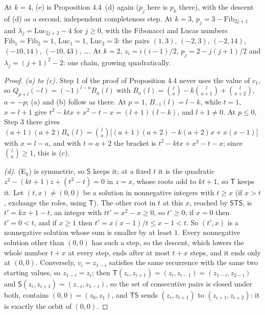 \documentclass[11pt]{article}
\begin{document}
\smallskip
At $k=4$, (e) is Proposition 4.4~(d) again ($p_j$ here is $p_k$ there), with the descent of (d) as a second, independent completeness step. At $k=3$, $p_j=3-\mathrm{Fib}_{2j+1}$ and $\lambda_j=\mathrm{Luc}_{2j+2}-4$ for $j\ge0$, with the Fibonacci and Lucas numbers $\mathrm{Fib}_1=\mathrm{Fib}_2=1$, $\mathrm{Luc}_1=1$, $\mathrm{Luc}_2=3$: the pairs $(1,3)$, $(-2,3)$, $(-2,14)$, $(-10,14)$, $(-10,43)$, \dots. At $k=2$, $z_i=i(i-1)/2$, $p_j=2-j(j+1)/2$ and $\lambda_j=(j+1)^2-2$: one chain, growing quadratically.

\begin{proof}
\emph{(a) to (c).} Step 1 of the proof of Proposition 4.4 never uses the value of $c_1$, so $Q_{p+l}(-l)=(-1)^{l-a}B_a(l)$ with $B_a(l)=\binom{l}{a}-k\binom{l}{a+1}+\binom{l}{a+2}$, $a=-p$; (a) and (b) follow as there. At $p=1$, $B_{-1}(l)=l-k$, while $t=1$, $x=l+1$ give $t^2-ktx+x^2-t-x=(l+1)(l-k)$, and $l+1\ne0$. At $p\le0$, Step 3 there gives $(a+1)(a+2)B_a(l)=\binom{l}{a}\bigl[(a+1)(a+2)-k(a+2)x+x(x-1)\bigr]$ with $x=l-a$, and with $t=a+2$ the bracket is $t^2-ktx+x^2-t-x$; since $\binom{l}{a}\ge1$, this is (c).

\emph{(d).} (E$_k$) is symmetric, so $\mathsf{S}$ keeps it; at a fixed $t$ it is the quadratic $z^2-(kt+1)z+(t^2-t)=0$ in $z=x$, whose roots add to $kt+1$, so $\mathsf{T}$ keeps it. Let $(t,x)\ne(0,0)$ be a solution in nonnegative integers with $t\ge x$ (if $x>t$, exchange the roles, using $\mathsf{T}$). The other root in $t$ at this $x$, reached by $\mathsf{S}\mathsf{T}\mathsf{S}$, is $t'=kx+1-t$, an integer with $tt'=x^2-x\ge0$, so $t'\ge0$; if $x=0$ then $t'=0<t$, and if $x\ge1$ then $t'=x(x-1)/t\le x-1<t$. So $(t',x)$ is a nonnegative solution whose sum is smaller by at least $1$. Every nonnegative solution other than $(0,0)$ has such a step, so the descent, which lowers the whole number $t+x$ at every step, ends after at most $t+x$ steps, and it ends only at $(0,0)$. Conversely, $v_i=z_{1-i}$ satisfies the same recurrence with the same two starting values, so $z_{1-i}=z_i$; then $\mathsf{T}(z_i,z_{i+1})=(z_i,z_{i-1})=(z_{1-i},z_{2-i})$ and $\mathsf{S}(z_i,z_{i+1})=(z_{-i},z_{1-i})$, so the set of consecutive pairs is closed under both, contains $(0,0)=(z_0,z_1)$, and $\mathsf{T}\mathsf{S}$ sends $(z_i,z_{i+1})$ to $(z_{i+1},z_{i+2})$: it is exactly the orbit of $(0,0)$.


\end{proof}
\end{document}
